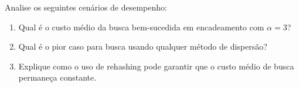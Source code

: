 \begin{exercicio}
Analise os seguintes cenários de desempenho:
\begin{enumerate}
  \item Qual é o custo médio da busca bem-sucedida em encadeamento com $\alpha = 3$?
  \item Qual é o pior caso para busca usando qualquer método de dispersão?
  \item Explique como o uso de rehashing pode garantir que o custo médio de busca permaneça constante.
\end{enumerate}
\end{exercicio}

